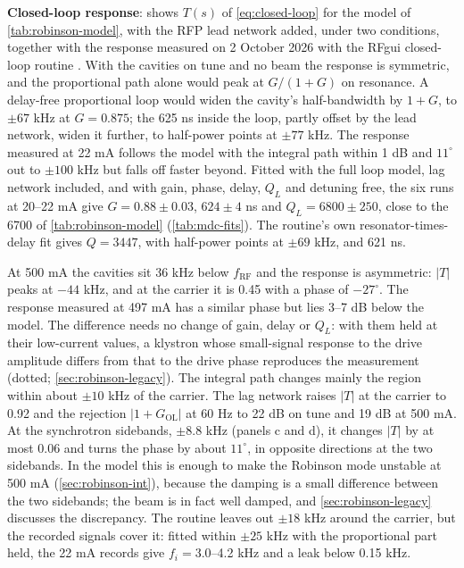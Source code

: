 \textbf{Closed-loop response}:  shows \(T(s)\) of \cref{eq:closed-loop} for the model of \cref{tab:robinson-model}, with the RFP lead network added, under two conditions, together with the response measured on 2 October 2026 with the RFgui closed-loop routine . With the cavities on tune and no beam the response is symmetric, and the proportional path alone would peak at \(G/(1+G)\) on resonance. A delay-free proportional loop would widen the cavity's half-bandwidth by \(1+G\), to \(\pm 67\) kHz at \(G = 0.875\); the 625 ns inside the loop, partly offset by the lead network, widen it further, to half-power points at \(\pm 77\) kHz. The response measured at 22 mA follows the model with the integral path within 1 dB and \(11^\circ\) out to \(\pm 100\) kHz but falls off faster beyond. Fitted with the full loop model, lag network included, and with gain, phase, delay, \(Q_L\) and detuning free, the six runs at 20--22 mA give \(G = 0.88 \pm 0.03\), \(624 \pm 4\) ns and \(Q_L = 6800 \pm 250\), close to the 6700 of \cref{tab:robinson-model} (\cref{tab:mdc-fits}). The routine's own resonator-times-delay fit gives \(Q = 3447\), with half-power points at \(\pm 69\) kHz, and 621 ns.

At 500 mA the cavities sit 36 kHz below \(f_\text{RF}\) and the response is asymmetric: \(\lvert T\rvert\) peaks at \(-44\) kHz, and at the carrier it is 0.45 with a phase of \(-27^\circ\). The response measured at 497 mA has a similar phase but lies 3--7 dB below the model. The difference needs no change of gain, delay or \(Q_L\): with them held at their low-current values, a klystron whose small-signal response to the drive amplitude differs from that to the drive phase reproduces the measurement (dotted; \cref{sec:robinson-legacy}). The integral path changes mainly the region within about \(\pm 10\) kHz of the carrier. The lag network raises \(\lvert T\rvert\) at the carrier to 0.92 and the rejection \(\lvert 1 + G_\text{OL}\rvert\) at 60 Hz to 22 dB on tune and 19 dB at 500 mA. At the synchrotron sidebands, \(\pm 8.8\) kHz (panels c and d), it changes \(\lvert T\rvert\) by at most 0.06 and turns the phase by about \(11^\circ\), in opposite directions at the two sidebands. In the model this is enough to make the Robinson mode unstable at 500 mA (\cref{sec:robinson-int}), because the damping is a small difference between the two sidebands; the beam is in fact well damped, and \cref{sec:robinson-legacy} discusses the discrepancy. The routine leaves out \(\pm 18\) kHz around the carrier, but the recorded signals cover it: fitted within \(\pm 25\) kHz with the proportional part held, the 22 mA records give \(f_i = 3.0\)--4.2 kHz and a leak below 0.15 kHz.

